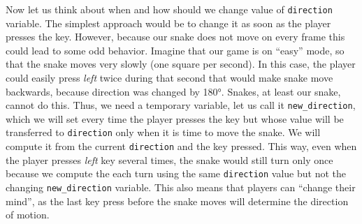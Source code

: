 \documentclass[
]{book}
\begin{document}
Now let us think about when and how should we change value of \texttt{direction} variable. The simplest approach would be to change it as soon as the player presses the key. However, because our snake does not move on every frame this could lead to some odd behavior. Imagine that our game is on ``easy'' mode, so that the snake moves very slowly (one square per second). In this case, the player could easily press \emph{left} twice during that second that would make snake move backwards, because direction was changed by 180°. Snakes, at least our snake, cannot do this. Thus, we need a temporary variable, let us call it \texttt{new\_direction}, which we will set every time the player presses the key but whose value will be transferred to \texttt{direction} only when it is time to move the snake. We will compute it from the current \texttt{direction} and the key pressed. This way, even when the player presses \emph{left} key several times, the snake would still turn only once because we compute the each turn using the same \texttt{direction} value but not the changing \texttt{new\_direction} variable. This also means that players can ``change their mind'', as the last key press before the snake moves will determine the direction of motion.
\end{document}

